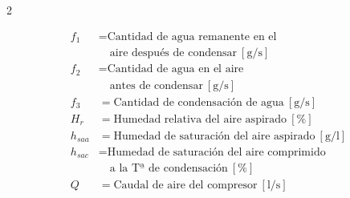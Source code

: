 \documentclass[11pt]{article}
\begin{document}
\begin{multicols*}{2}
    \begin{minipage}
    {\linewidth}
        \begin{align*}
            f_1 &= \text{Cantidad de agua remanente en el } \\
            &\quad \text{aire después de condensar} \ \mathrm{[g/s]} \\
            f_2 &= \text{Cantidad de agua en el aire } \\
            &\quad \text{antes de condensar} \ \mathrm{[g/s]} \\
            f_3 &= \text{Cantidad de condensación de agua} \ \mathrm{[g/s]} \\
            H_r &= \text{Humedad relativa del aire aspirado}  \ \mathrm{[\%]} \\
            h_{saa} &= \text{Humedad de saturación del aire aspirado} \ \mathrm{[g/l]}\\
            h_{sac} &= \text{Humedad de saturación del aire comprimido} \\ 
            &\quad \text{a la Tª de condensación} \ \mathrm{[\%]}\\
            Q &= \text{Caudal de aire del compresor} \ \mathrm{[l/s]}
        \end{align*}
    \end{minipage}

\end{multicols*}
\end{document}
